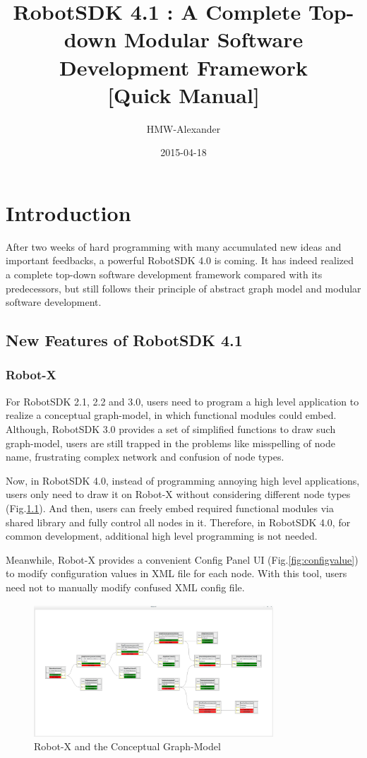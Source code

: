 \documentclass[a4paper,10pt]{book}
\title{{\LARGE\bf{RobotSDK 4.1 : A Complete Top-down Modular Software Development Framework}} \\ {\Large[Quick Manual]}}
\author{HMW-Alexander}
\date{2015-04-18}
\begin{document}
\maketitle
\tableofcontents

\chapter{Introduction}

After two weeks of hard programming with many accumulated new ideas and important feedbacks, a powerful RobotSDK 4.0 is coming.
It has indeed realized a complete top-down software development framework compared with its predecessors, but still follows their principle of abstract graph model and modular software development.

\section{New Features of RobotSDK 4.1}

\subsection{Robot-X}

For RobotSDK 2.1, 2.2 and 3.0, users need to program a high level application to realize a conceptual graph-model, in which functional modules could embed. Although, RobotSDK 3.0 provides a set of simplified functions to draw such graph-model, users are still trapped in the problems like misspelling of node name, frustrating complex network and confusion of node types.

Now, in RobotSDK 4.0, instead of programming annoying high level applications, users only need to draw it on Robot-X without considering different node types (Fig.\ref{fig:robotx}). And then, users can freely embed required functional modules via shared library and fully control all nodes in it. Therefore, in RobotSDK 4.0, for common development, additional high level programming is not needed.

Meanwhile, Robot-X provides a convenient Config Panel UI (Fig.\ref{fig:configvalue}) to modify configuration values in XML file for each node. With this tool, users need not to manually modify confused XML config file.

\begin{figure}
 \centering
 \includegraphics[width=0.8\textwidth]{img/Robot-X.png}
 \caption{Robot-X and the Conceptual Graph-Model}
 \label{fig:robotx}
\end{figure}
\end{document}
